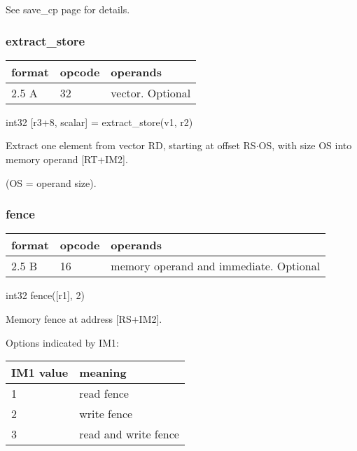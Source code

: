 \documentclass[forwardcom.tex]{subfiles}
\begin{document}
See save\_cp page \pageref{table:saveCpInstruction} for details.

\subsubsection{extract\_store}
\label{table:extractStoreInstruction}
\begin{tabular}{|p{12mm}|p{12mm}|p{110mm}|}
\hline
\bfseries format & \bfseries opcode & \bfseries operands \\ \hline
2.5 A & 32 & vector. Optional \\ \hline
\end{tabular}
\vspace{2mm}

int32 [r3+8, scalar] = extract\_store(v1, r2)
\vspace{2mm}

Extract one element from vector RD, starting at offset RS$\cdot$OS, with size OS into memory operand [RT+IM2].

(OS = operand size).


\subsubsection{fence}
\label{table:fenceInstruction}
\begin{tabular}{|p{12mm}|p{12mm}|p{110mm}|}
\hline
\bfseries format & \bfseries opcode & \bfseries operands \\ \hline
2.5 B & 16 & memory operand and immediate. Optional \\ \hline
\end{tabular}
\vspace{2mm}

int32   fence([r1], 2)
\vspace{2mm}

Memory fence at address [RS+IM2].
\vspace{2mm}

Options indicated by IM1:

\begin{longtable}{|p{20mm}|p{50mm}|}
\endfirsthead
\endhead
\hline
\bfseries IM1 value & \bfseries meaning \\ \hline
1 & read fence \\ \hline
2 & write fence \\ \hline
3 & read and write fence \\ \hline
\end{longtable}
\vspace{2mm}
\end{document}
